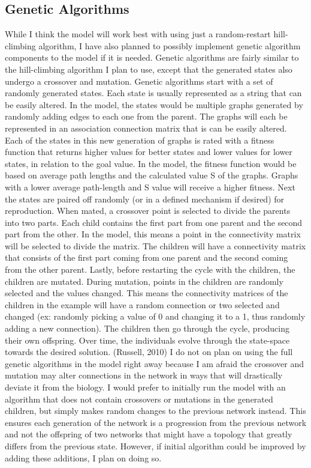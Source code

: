 \documentclass[12pt,letterpaper]{report}
\begin{document}
\subsection{Genetic Algorithms}
	While I think the model will work best with using just a random-restart hill-climbing algorithm, I have also planned to possibly implement genetic algorithm components to the model if it is needed. Genetic algorithms are fairly similar to the hill-climbing algorithm I plan to use, except that the generated states also undergo a crossover and mutation. Genetic algorithms start with a set of randomly generated states. Each state is usually represented as a string that can be easily altered. In the model, the states would be multiple graphs generated by randomly adding edges to each one from the parent. The graphs will each be represented in an association connection matrix that is can be easily altered. Each of the states in this new generation of graphs is rated with a fitness function that returns higher values for better states and lower values for lower states, in relation to the goal value. In the model, the fitness function would be based on average path lengths and the calculated value S of the graphs. Graphs with a lower average path-length and S value will receive a higher fitness. Next the states are paired off randomly (or in a defined mechanism if desired) for reproduction. When mated, a crossover point is selected to divide the parents into two parts. Each child contains the first part from one parent and the second part from the other. In the model, this means a point in the connectivity matrix will be selected to divide the matrix. The children will have a connectivity matrix that consists of the first part coming from one parent and the second coming from the other parent. Lastly, before restarting the cycle with the children, the children are mutated. During mutation, points in the children are randomly selected and the values changed. This means the connectivity matrices of the children in the example will have a random connection or two selected and changed (ex: randomly picking a value of 0 and changing it to a 1, thus randomly adding a new connection). The children then go through the cycle, producing their own offspring. Over time, the individuals evolve through the state-space towards the desired solution. (Russell, 2010)
	I do not on plan on using the full genetic algorithms in the model right away because I am afraid the crossover and mutation may alter connections in the network in ways that will drastically deviate it from the biology. I would prefer to initially run the model with an algorithm that does not contain crossovers or mutations in the generated children, but simply makes random changes to the previous network instead. This ensures each generation of the network is a progression from the previous network and not the offspring of two networks that might have a topology that greatly differs from the previous state. However, if initial algorithm could be improved by adding these additions, I plan on doing so.
\end{document}
